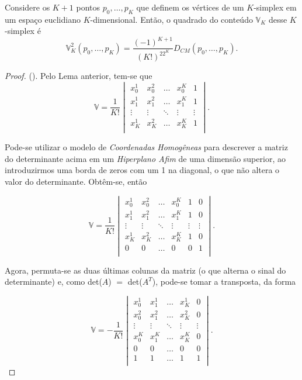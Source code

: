 \begin{teorema}
	Considere os $K+1$ pontos $p_0, \dots, p_K$ que definem os vértices de um $K$-simplex em um espaço euclidiano $K$-dimensional. Então, o quadrado do conteúdo $\mathbb{V}_K$ desse $K$-simplex é
	\begin{equation}
		\mathbb{V}_K^2(p_0, \dots, p_K) = \frac{(-1)^{K+1}}{(K!)^22^K} D_{CM}(p_0, \dots, p_K).
		\label{eq:volumeKdimensionalNSimplex}
	\end{equation}
	
	\begin{proof}(\cite{douglasGD}). Pelo Lema anterior, tem-se que 
		$$\mathbb{V} = \frac{1}{K!} 
		\begin{vmatrix}
			x_0^1 & x^2_{0} & \ldots & x^K_{0} & 1\\ 
			x^1_{1} & x^2_1 & \ldots & x^K_{1} & 1\\ 
			\vdots & \vdots & \ddots & \vdots & \vdots\\ 
			x^1_{K} & x^2_{K} & \ldots & x_K^K & 1\\ 
		\end{vmatrix}.
		$$
		
		\noindent Pode-se utilizar o modelo de \textit{Coordenadas Homogêneas} para descrever a matriz do determinante acima em um \textit{Hiperplano Afim} de uma dimensão superior, ao introduzirmos uma borda de zeros com um 1 na diagonal, o que não altera o valor do determinante. Obtêm-se, então
		
		\begin{equation}
			\mathbb{V} = \frac{1}{K!} 
			\begin{vmatrix}
				x_0^1 & x^2_{0} & \ldots & x^K_{0} & 1 & 0\\ 
				x^1_{1} & x^2_1 & \ldots & x^K_{1} & 1 & 0\\ 
				\vdots & \vdots & \ddots & \vdots & \vdots & \vdots\\ 
				x^1_{K} & x^2_{K} & \ldots & x_K^K & 1 & 0\\
				0 & 0 & \ldots & 0 & 0 & 1\\ 
			\end{vmatrix}.
			\label{eq:detA}
		\end{equation}
		
		\noindent Agora, permuta-se as duas últimas colunas da matriz (o que alterna o sinal do determinante) e, como det($A$) $=$ det($A^T$), pode-se tomar a transposta, da forma
		
		\begin{equation}
			\mathbb{V} = -\frac{1}{K!} 
			\begin{vmatrix}
				x_0^1 & x^1_{1} & \ldots & x^1_{K} & 0\\ 
				x^2_0 & x^2_1 & \ldots & x^2_{K} & 0\\ 
				\vdots & \vdots & \ddots & \vdots & \vdots \\ 
				x^K_{0} & x^K_{1} & \ldots & x_K^K & 0\\
				0 & 0 & \ldots & 0 & 0 \\ 
				1 & 1 & \ldots & 1 & 1 \\ 
			\end{vmatrix}.
			\label{eq:detAT}
		\end{equation}
		

\end{proof}
\end{teorema}
